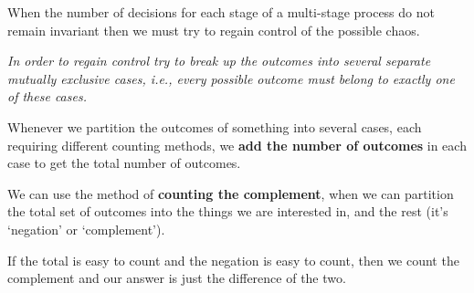 \documentclass{article}
\begin{document}

\begin{tcolorbox}[title={PST: Mutually Exclusive Cases}, colback={white},colframe={black},sharp corners,colbacktitle={white},coltitle={black},fonttitle=\bfseries,subtitle style={boxrule=0.4pt,colback=white}]		
When the number of decisions for each stage of a multi-stage process do not remain invariant then we must try to regain control of the possible chaos.

\textit{In order to regain control try to break up the outcomes into several separate mutually exclusive cases, i.e., every possible outcome must belong to exactly one of these cases.}
\end{tcolorbox}


\begin{tcolorbox}[title={PST: Partition Leads to Addition}, colback={white},colframe={black},sharp corners,colbacktitle={white},coltitle={black},fonttitle=\bfseries,subtitle style={boxrule=0.4pt,colback=white}]

Whenever we partition the outcomes of something into several cases, each requiring different counting methods, we \textbf{add the number of outcomes} in each case to get the total number of outcomes.
\end{tcolorbox}
  
 
\begin{tcolorbox}[title={PST: Counting the Complement},colback={white},colframe={black},sharp corners,colbacktitle={white},coltitle={black},fonttitle=\bfseries,subtitle style={boxrule=0.4pt,colback=white}]


We can use the method of \textbf{counting the complement}, when we can partition the total set of outcomes into the things we are interested in, and the rest (it's `negation' or `complement'). 
  
If the total is easy to count and the negation is easy to count, then we count the complement and our answer is just the difference of the two.
\end{tcolorbox}
\end{document}
